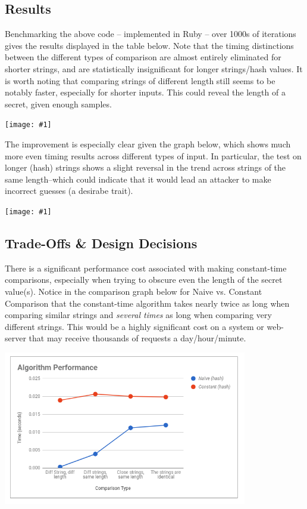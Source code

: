 \documentclass{article}
\providecommand{\image}[1]{
    \begin{center}
        \texttt{[image: \#1]}
    \end{center}
}
\begin{document}
\subsection{Results}
Benchmarking the above code -- implemented in Ruby -- over 1000s of iterations gives the results displayed in the table below. Note that the timing distinctions between the different types of comparison are almost entirely eliminated for shorter strings, and are statistically insignificant for longer strings/hash values. It is worth noting that comparing strings of different length still seems to be notably faster, especially for shorter inputs. This could reveal the length of a secret, given enough samples.

\image{constant_results.png}

The improvement is especially clear given the graph below, which shows much more even timing results across different types of input. In particular, the test on longer (hash) strings shows a slight reversal in the trend across strings of the same length--which could indicate that it would lead an attacker to make incorrect guesses (a desirabe trait).

\image{constant_graph.png}

\subsection{Trade-Offs \& Design Decisions}
There is a significant performance cost associated with making constant-time comparisons, especially when trying to obscure even the length of the secret value(s). Notice in the comparison graph below for Naive vs. Constant Comparison that the constant-time algorithm takes nearly twice as long when comparing similar strings and \textit{several times} as long when comparing very different strings. This would be a highly significant cost on a system or web-server that may receive thousands of requests a day/hour/minute. \par

\begin{center}
    \includegraphics[width=0.8\textwidth]
        {alg_perf.png}
\end{center}
\end{document}
